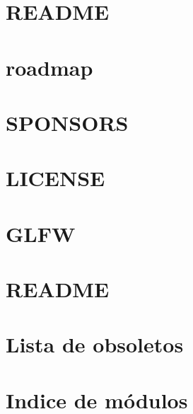 \let\mypdfximage\pdfximage\def\pdfximage{\immediate\mypdfximage}\documentclass[twoside]{book}
\newcommand{\+}{\discretionary{\mbox{\scriptsize$\hookleftarrow$}}{}{}}
\begin{document}
\chapter{R\+E\+A\+D\+ME}
\label{md_cmake-build-debug__deps_raylib-src__r_e_a_d_m_e}

\chapter{roadmap}
\label{md_cmake-build-debug__deps_raylib-src__r_o_a_d_m_a_p}

\chapter{S\+P\+O\+N\+S\+O\+RS}
\label{md_cmake-build-debug__deps_raylib-src__s_p_o_n_s_o_r_s}

\chapter{L\+I\+C\+E\+N\+SE}
\label{md_cmake-build-debug__deps_raylib-src_src_external_glfw__l_i_c_e_n_s_e}

\chapter{G\+L\+FW}
\label{md_cmake-build-debug__deps_raylib-src_src_external_glfw__r_e_a_d_m_e}

\chapter{R\+E\+A\+D\+ME}
\label{md__r_e_a_d_m_e}

\chapter{Lista de obsoletos}
\label{deprecated}

\chapter{Indice de módulos}

\end{document}
